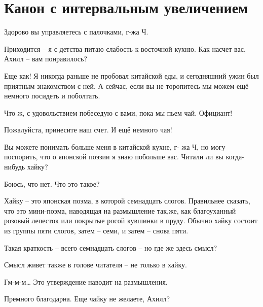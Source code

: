 \documentclass[../main.tex]{subfiles}
\begin{document}
\section{Канон с интервальным увеличением}


\begin{dialogue}

 Здорово вы управляетесь с палочками, г-жа Ч.

 Приходится \--- я с детства питаю слабость к восточной кухню. Как насчет вас, Ахилл \--- вам понравилось?

 Еще как! Я никогда раньше не пробовал китайской еды, и сегодняшний ужин был приятным знакомством с ней. А сейчас, если вы не торопитесь мы можем ещё немного посидеть и поболтать.

 Что ж, с удовольствием побеседую с вами, пока мы пьем чай. Официант!


Пожалуйста, принесите наш счет. И ещё немного чая!


 Вы можете понимать больше меня в китайской кухне, г- жа Ч, но могу поспорить, что о японской поэзии я знаю побольше вас. Читали ли вы когда-нибудь хайку?

 Боюсь, что нет. Что это такое?

 Хайку \--- это японская поэма, в которой семнадцать слогов. Правильнее сказать, что это мини-поэма, наводящая на размышление так,же, как благоуханный розовый лепесток или покрытые росой кувшинки в пруду. Обычно хайку состоит из группы пяти слогов, затем \--- семи, и затем \--- снова пяти.

 Такая краткость \--- всего семнадцать слогов \--- но где же здесь смысл?

 Смысл живет также в голове читателя \--- не только в хайку.

 Гм-м-м\ldots{} Это утверждение наводит на размышления.


Премного благодарна. Еще чайку не желаете, Ахилл?


\end{dialogue}
\end{document}
